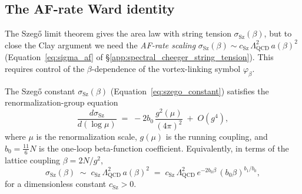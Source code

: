 \subsection{The AF-rate Ward identity}
\label{ssec:af_ward}

The Szeg\H{o} limit theorem gives the area law with string tension
$\sigma_{\mathrm{Sz}}(\beta)$, but to close the Clay argument we
need the \emph{AF-rate scaling}
$\sigma_{\mathrm{Sz}}(\beta)\sim c_{\mathrm{Sz}}\,
\Lambda_{\mathrm{QCD}}^{2}\,a(\beta)^{2}$
(Equation~\eqref{eq:sigma_af} of
\S\ref{app:spectral_cheeger_string_tension}). This requires
control of the $\beta$-dependence of the vortex-linking symbol
$\varphi_{\beta}$.

\begin{hypothesis}
\label{hyp:af_ward}
The Szeg\H{o} constant $\sigma_{\mathrm{Sz}}(\beta)$
(Equation~\eqref{eq:szego_constant}) satisfies the
renormalization-group equation
\begin{equation}
\label{eq:af_ward}
  \frac{d\sigma_{\mathrm{Sz}}}{d(\log\mu)}
  \;=\;-2b_{0}\,\frac{g^{2}(\mu)}{(4\pi)^{2}}
  \;+\;O(g^{4}),
\end{equation}
where $\mu$ is the renormalization scale, $g(\mu)$ is the running
coupling, and $b_{0}=\tfrac{11}{6}N$ is the one-loop beta-function
coefficient. Equivalently, in terms of the lattice coupling
$\beta=2N/g^{2}$,
\begin{equation}
\label{eq:af_ward_beta}
  \sigma_{\mathrm{Sz}}(\beta)
  \;\sim\;c_{\mathrm{Sz}}\,\Lambda_{\mathrm{QCD}}^{2}\,
  a(\beta)^{2}
  \;=\;c_{\mathrm{Sz}}\,\Lambda_{\mathrm{QCD}}^{2}\,
  e^{-2b_{0}\beta}\,(b_{0}\beta)^{b_{1}/b_{0}},
\end{equation}
for a dimensionless constant $c_{\mathrm{Sz}}>0$.
\end{hypothesis}

